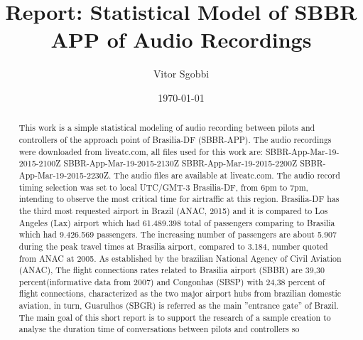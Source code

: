 \documentclass[a4paper,10pt]{report}
\title{Report: Statistical Model of SBBR APP of Audio Recordings}
\author{Vitor Sgobbi}
\date{\today}
\begin{document}
\maketitle

\begin{abstract}
This work is a simple statistical modeling of audio recording between pilots and controllers of the approach point of Brasilia-DF (SBBR-APP).
The audio recordings were downloaded from liveatc.com, all files used for this work are: SBBR-App-Mar-19-2015-2100Z
	SBBR-App-Mar-19-2015-2130Z SBBR-App-Mar-19-2015-2200Z SBBR-App-Mar-19-2015-2230Z. The audio files are available at liveatc.com.
	The audio record timing selection was set to local UTC/GMT-3 Brasilia-DF, from 6pm to 7pm, intending to observe the most critical
	time for airtraffic at this region.
	Brasilia-DF has the third most requested airport in Brazil (ANAC, 2015) and it is compared to Los Angeles (Lax) airport
	which had 61.489.398 total of passengers comparing to Brasilia
	which had 9.426.569 passengers. 
	The increasing number of passengers are about 5.907 during the peak travel times at Brasilia airport, compared to 3.184, number quoted from ANAC at 2005.
	As established by the brazilian National Agency of Civil Aviation (ANAC),   	
	The flight connections rates related to Brasilia airport (SBBR) are 39,30 percent(informative data from 2007) and Congonhas (SBSP) 
	with 24,38 percent of flight connections, characterized as the two major airport hubs from brazilian domestic aviation, in turn, Guarulhos (SBGR) is referred
	as the main ''entrance gate'' of Brazil.
	The main goal of this short report is to support the research of a sample creation to analyse the duration time of conversations between pilots and controllers
	so %
	
\end{abstract}
\end{document}
